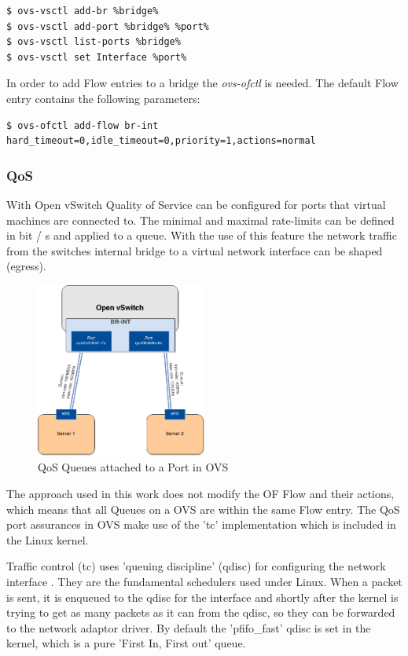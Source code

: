 \begin{lstlisting}[language=commands]
$ ovs-vsctl add-br %bridge%
$ ovs-vsctl add-port %bridge% %port%
$ ovs-vsctl list-ports %bridge%
$ ovs-vsctl set Interface %port%
\end{lstlisting}

In order to add Flow entries to a bridge the \textit{ovs-ofctl} is needed. The default Flow entry contains the following parameters:

\begin{lstlisting}[language=commands]
$ ovs-ofctl add-flow br-int hard_timeout=0,idle_timeout=0,priority=1,actions=normal
\end{lstlisting}

\newpage
\subsubsection{QoS}

With Open vSwitch Quality of Service can be configured for ports that virtual machines are connected to. The minimal and maximal rate-limits can be defined in bit / s and applied to a queue. With the use of this feature the network traffic from the switches internal bridge to a virtual network interface can be shaped (egress).

\begin{figure}[H]
\centering
\includegraphics[width=0.5\textwidth]{images/fundamentals/openvswitch_qos-queues.png}
\caption{QoS Queues attached to a Port in OVS}
\end{figure}

The approach used in this work does not modify the OF Flow and their actions, which means that all Queues on a OVS are within the same Flow entry. The QoS port assurances in OVS make use of the 'tc' implementation which is included in the Linux kernel.


Traffic control (tc) uses 'queuing discipline' (qdisc) for configuring the network interface \cite{tc-manual}. They are the fundamental schedulers used under Linux. When a packet is sent, it is enqueued to the qdisc for the interface and shortly after the kernel is trying to get as many packets as it can from the qdisc, so they can be forwarded to the network adaptor driver. By default the 'pfifo\_fast' qdisc is set in the kernel, which is a pure 'First In, First out' queue.

